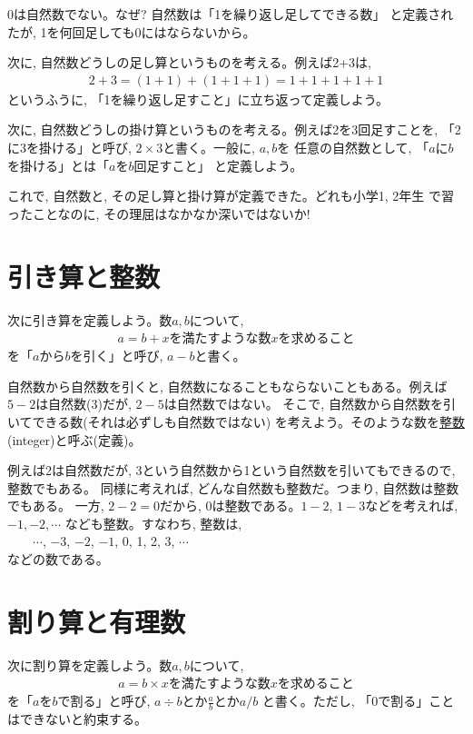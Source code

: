0は自然数でない。なぜ? 自然数は「1を繰り返し足してできる数」
と定義されたが, 1を何回足しても0にはならないから。\mv

次に, 自然数どうしの足し算というものを考える。例えば2+3は,
\begin{eqnarray*}
2+3=(1+1)+(1+1+1)=1+1+1+1+1
\end{eqnarray*}
というふうに, 「1を繰り返し足すこと」に立ち返って定義しよう。\mv

次に, 自然数どうしの掛け算というものを考える。例えば2を3回足すことを, 
「2に3を掛ける」と呼び, $2\times3$と書く。一般に, $a, b$を
任意の自然数として, 「$a$に$b$を掛ける」とは「$a$を$b$回足すこと」
と定義しよう。\mv

これで, 自然数と, その足し算と掛け算が定義できた。どれも小学1, 2年生
で習ったことなのに, その理屈はなかなか深いではないか!\\


\section{引き算と整数}

次に引き算を定義しよう。数$a, b$について, 
\begin{eqnarray}
a=b+x\text{を満たすような数$x$を求めること}\label{eq:def_subtract}
\end{eqnarray}
を「$a$から$b$を引く」と呼び, $a-b$と書く。

自然数から自然数を引くと, 自然数になることもならないこともある。例えば
$5-2$は自然数(3)だが, $2-5$は自然数ではない。
そこで, 自然数から自然数を引いてできる数(それは必ずしも自然数ではない)
を考えよう。そのような数を\underline{整数} (integer)と呼ぶ(定義)。

例えば2は自然数だが, 3という自然数から1という自然数を引いてもできるので, 整数でもある。
同様に考えれば, どんな自然数も整数だ。つまり, 自然数は整数でもある。
一方, $2-2=0$だから, 0は整数である。$1-2$, $1-3$などを考えれば, $-1, -2, \cdots$
なども整数。すなわち, 整数は, \\
　　$\cdots$, $-3$, $-2$, $-1$, 0, 1, 2, 3, $\cdots$\\などの数である。

\section{割り算と有理数}

次に割り算を定義しよう。数$a, b$について, 
\begin{eqnarray}
a=b\times x\text{を満たすような数$x$を求めること}\label{eq:def_mult}
\end{eqnarray}
を「$a$を$b$で割る」と呼び, $a\div b$とか$\frac{a}{b}$とか$a/b$
と書く。ただし, 「0で割る」ことはできないと約束する。

